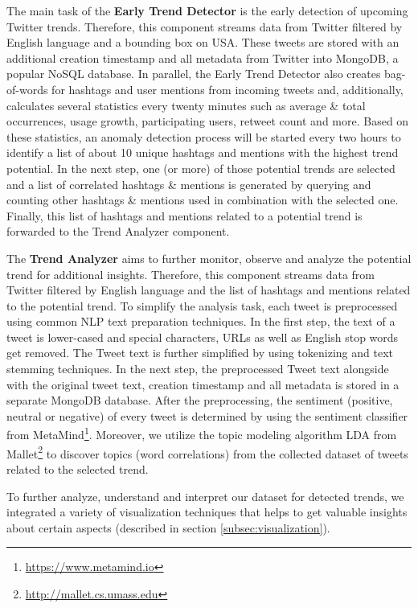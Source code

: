 The main task of the \textbf{Early Trend Detector} is the early detection of upcoming Twitter trends. Therefore, this component streams data from Twitter filtered by English language and a bounding box on USA. These tweets are stored with an additional creation timestamp and all metadata from Twitter into MongoDB, a popular NoSQL database. In parallel, the Early Trend Detector also creates bag-of-words for hashtags and user mentions from incoming tweets and, additionally, calculates several statistics every twenty minutes such as average \& total occurrences, usage growth, participating users, retweet count and more. Based on these statistics, an anomaly detection process will be started every two hours to identify a list of about 10 unique hashtags and mentions with the highest trend potential. In the next step, one (or more) of those potential trends are selected and a list of correlated hashtags \& mentions is generated by querying and counting other hashtags \& mentions used in combination with the selected one. Finally, this list of hashtags and mentions related to a potential trend is forwarded to the Trend Analyzer component.

The \textbf{Trend Analyzer} aims to further monitor, observe and analyze the potential trend for additional insights. Therefore, this component streams data from Twitter filtered by English language and the list of hashtags and mentions related to the potential trend. To simplify the analysis task, each tweet is preprocessed using common NLP text preparation techniques. In the first step, the text of a tweet is lower-cased and special characters, URLs as well as English stop words get removed. The Tweet text is further simplified by using tokenizing and text stemming techniques. In the next step, the preprocessed Tweet text alongside with the original tweet text, creation timestamp and all metadata is stored in a separate MongoDB database. After the preprocessing, the sentiment (positive, neutral or negative) of every tweet is determined by using the sentiment classifier from MetaMind\footnote{\url{https://www.metamind.io} \accessednote}. Moreover, we utilize the topic modeling algorithm LDA from Mallet\footnote{\url{http://mallet.cs.umass.edu} \accessednote} to discover topics (word correlations) from the collected dataset of tweets related to the selected trend. 

To further analyze, understand and interpret our dataset for detected trends, we integrated a variety of visualization techniques that helps to get valuable insights about certain aspects (described in section \ref{subsec:visualization}). 